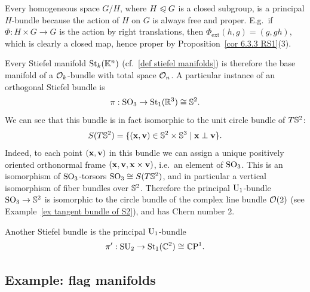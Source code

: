 \begin{example}
    Every homogeneous space $G\slash H$, where $H\sube G$ is a closed subgroup, is a principal $H$-bundle because the action of $H$ on $G$ is always free and proper. E.g.~if $\Phi:H\times G\to G$ is the action by right translations, then $\Phi_{\mathrm{ext}}(h,g)=(g,gh)$, which is clearly a closed map, hence proper by Proposition~\ref{cor 6.3.3 RS1}(3).
\end{example}


\begin{example}\label{ex O2 Stiefel bundle}
    Every Stiefel manifold $\St_k(\bbK^n)$ (cf.\ \ref{def stiefel manifolds}) is therefore the base manifold of a $\calO_k$-bundle with total space $\calO_n$. A particular instance of an orthogonal Stiefel bundle is \[\pi:\SO_3\to \St_1(\bbR^3)\cong \bbS^2.\]
    We can see that this bundle is in fact isomorphic to the unit circle bundle of $T\bbS^2$:
    \[S(T\bbS^2)=\{(\bf{x},\bf{v})\in\bbS^2\times\bbS^3\mid \bf{x}\perp\bf{v}\}.\]
    Indeed, to each point $(\bf{x},\bf{v})$ in this bundle we can assign a unique positively oriented orthonormal frame $(\bf{x},\bf{v},\bf{x}\times\bf{v})$, i.e.\ an element of $\SO_3$. This is an isomorphism of $\SO_3$-torsors $\SO_3\cong S(T\bbS^2)$, and in particular a vertical isomorphism of fiber bundles over $\bbS^2$.  Therefore the principal $\U_1$-bundle $\SO_3\to \bbS^2$ is isomorphic to the circle bundle of the complex line bundle $\calO(2)$ (see Example~\ref{ex tangent bundle of S2}), and has Chern number $2$.

    Another Stiefel bundle is the principal $\U_1$-bundle
    \[\pi':\SU_2\to \St_1(\bbC^2)\cong \CP^1.\]
\end{example}





\subsection{Example: flag manifolds}\label{sec: flag manifolds}


